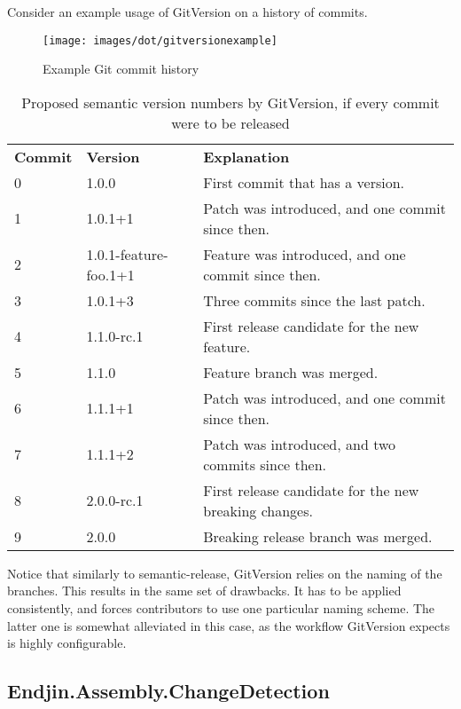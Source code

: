 \documentclass{l4proj}
\begin{document}
Consider an example usage of GitVersion on a history of commits.

\begin{figure}[H]
\centering
\texttt{[image: images/dot/gitversionexample]}
\caption{Example Git commit history}
\end{figure}

\begin{table}[H]
\centering
\label{my-label}
\begin{tabular}{|l|l|l|}
\textbf{Commit} & \textbf{Version} & \textbf{Explanation}                              \\
0      & 1.0.0                 & First commit that has a version.                      \\
1      & 1.0.1+1               & Patch was introduced, and one commit since then.      \\
2      & 1.0.1-feature-foo.1+1 & Feature was introduced, and one commit since then.    \\
3      & 1.0.1+3               & Three commits since the last patch.                   \\
4      & 1.1.0-rc.1            & First release candidate for the new feature.          \\
5      & 1.1.0                 & Feature branch was merged.                            \\
6      & 1.1.1+1               & Patch was introduced, and one commit since then.      \\
7      & 1.1.1+2               & Patch was introduced, and two commits since then.     \\
8      & 2.0.0-rc.1            & First release candidate for the new breaking changes. \\
9      & 2.0.0                 & Breaking release branch was merged.
\end{tabular}
\caption{Proposed semantic version numbers by GitVersion, if every
commit were to be released}
\end{table}

Notice that similarly to semantic-release, GitVersion relies on the
naming of the branches. This results in the same set of drawbacks. It
has to be applied consistently, and forces contributors to use one
particular naming scheme. The latter one is somewhat alleviated in
this case, as the workflow GitVersion expects is highly
configurable\cite{GitVersionConfiguration}.

\subsection{Endjin.Assembly.ChangeDetection}
\end{document}
